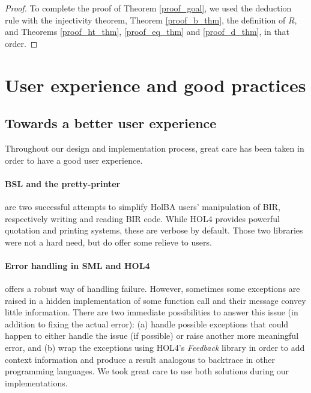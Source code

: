 \documentclass[10pt,a4paper]{article}
\begin{document}
\begin{multicols}{2}
\begin{proof}
To complete the proof of Theorem \ref{proof_goal}, we used the deduction rule with the injectivity theorem, Theorem \ref{proof_b_thm}, the definition of $R$, and Theorems \ref{proof_ht_thm}, \ref{proof_eq_thm} and \ref{proof_d_thm}, in that order.
\end{proof}


\section{User experience and good practices} \label{user-friendliness}

\subsection{Towards a better user experience} \label{towards-user-exp}

Throughout our design and implementation process, great care has been taken in order to have a good user experience.

\paragraph{BSL and the pretty-printer} are two successful attempts to simplify HolBA users' manipulation of BIR, respectively writing and reading BIR code. While HOL4 provides powerful quotation and printing systems, these are verbose by default. Those two libraries were not a hard need, but do offer some relieve to users.

\paragraph{Error handling in SML and HOL4} offers a robust way of handling failure. However, sometimes some exceptions are raised in a hidden implementation of some function call and their message convey little information. There are two immediate possibilities to answer this issue (in addition to fixing the actual error): (a) handle possible exceptions that could happen to either handle the issue (if possible) or raise another more meaningful error, and (b) wrap the exceptions using HOL4's \textit{Feedback} library in order to add context information and produce a result analogous to backtrace in other programming languages. We took great care to use both solutions during our implementations.


\end{multicols}
\end{document}
